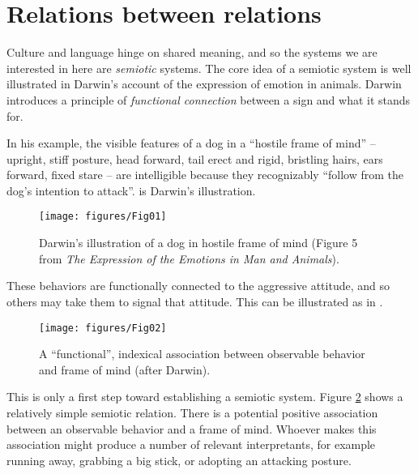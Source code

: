 

\section{Relations between relations}

Culture and language hinge on shared meaning, and so the systems we are interested in here are \textit{semiotic }systems. The core idea of a semiotic system 
is well illustrated in Darwin's account of the expression of emotion in 
animals. Darwin introduces a principle of \textit{functional connection 
}between a sign and what it stands for. 



In his example, the visible features of a dog in a ``hostile frame of 
mind'' -- upright, stiff posture, head forward, tail erect and rigid, 
bristling hairs, ears forward, fixed stare -- are intelligible because they 
recognizably ``follow from the dog's intention to attack''.  is 
Darwin's illustration.


\begin{figure}[p]
\texttt{[image: figures/Fig01]}
\caption{Darwin's illustration of a dog in hostile frame of mind 
(Figure 5 from \textit{The Expression of the Emotions in Man and 
Animals}).}
\label{darwin1}
\end{figure}



These behaviors are functionally connected to the aggressive attitude, 
and so others may take them to signal that attitude. This can be illustrated as in  .

\begin{figure}[p]
\texttt{[image: figures/Fig02]}
\caption{A ``functional'', indexical association between observable 
behavior and frame of mind (after Darwin).}
\label{functionalassoc}
\end{figure}


This is only a first step toward establishing a semiotic system. Figure 
\ref{functionalassoc} shows a relatively simple semiotic relation. There is a potential positive association between an 
observable behavior and a frame of mind. Whoever makes this association might produce a 
number of relevant interpretants, for example running away, grabbing a big 
stick, or adopting an attacking posture. 



